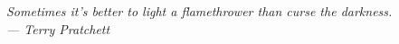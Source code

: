 \thispagestyle{empty}
{}

\vspace*{3cm}

\begin{center}
    \large\emph{Sometimes it's better to light a flamethrower than curse the darkness.\\
    \medskip
    --- Terry Pratchett}
    
\end{center}